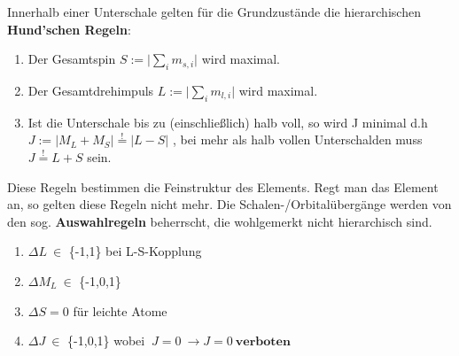 \documentclass[Ex4_Zusammenfassung.tex]{subfiles}
\begin{document}
Innerhalb einer Unterschale gelten für die Grundzustände die hierarchischen \textbf{Hund'schen Regeln}: 
\begin{enumerate}
\item Der Gesamtspin  $ S := \lvert \sum_{i} m_{s,i} \rvert $  wird maximal.
\item Der Gesamtdrehimpuls $ L:=  \lvert \sum_{i} m_{l,i} \rvert $ wird maximal.
\item Ist die Unterschale bis zu (einschließlich) halb voll, so wird J minimal d.h \\  $ J := \lvert M_L + M_S \rvert \stackrel{!}{=} \lvert L-S \rvert $ , bei mehr als halb vollen Unterschalden muss $ J \stackrel{!}{=} L+S $ sein. 
\end{enumerate} 

Diese Regeln bestimmen die Feinstruktur des Elements. Regt man das Element an, so gelten diese Regeln nicht mehr.  \newpage Die Schalen-/Orbitalübergänge werden von den sog. \textbf{Auswahlregeln} beherrscht, die wohlgemerkt nicht hierarchisch sind. 
\begin{enumerate}
\item $ \Delta L \  \in $ \{-1,1\}  bei L-S-Kopplung
\item $ \Delta M_L \   \in  $ \{-1,0,1\}  
\item $ \Delta S =0 $ für leichte Atome
\item $\Delta J \  \in $  \{-1,0,1\}   wobei $ \ J =0 \  \rightarrow J=0 \  \textbf{verboten} $
\end{enumerate}
\end{document}
